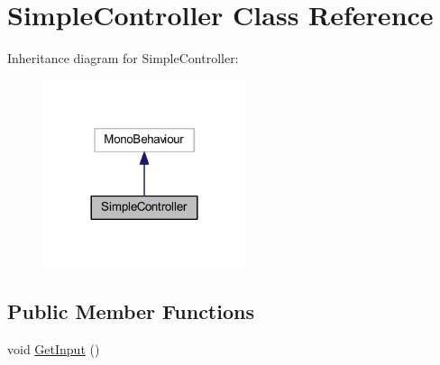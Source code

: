 \hypertarget{class_simple_controller}{}\section{Simple\+Controller Class Reference}
\label{class_simple_controller}


Inheritance diagram for Simple\+Controller\+:
\nopagebreak
\begin{figure}[H]
\begin{center}
\leavevmode
\includegraphics[width=168pt]{class_simple_controller__inherit__graph}
\end{center}
\end{figure}
\subsection*{Public Member Functions}
\begin{DoxyCompactItemize}
\item 
void \hyperlink{class_simple_controller_a70c61e7f2a95c10edd81fd9eed5b85bb}{Get\+Input} ()
\end{DoxyCompactItemize}
